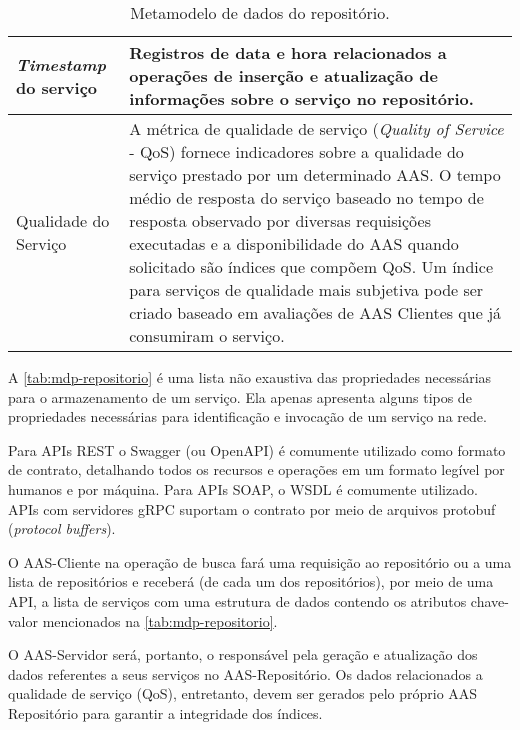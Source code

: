 \begin{table}[htb]
\begin{tabular}{p{4cm}p{11cm}}
		\hline
		\textit{Timestamp} do serviço
		 & Registros de data e hora relacionados a operações de inserção e atualização de informações sobre o serviço no repositório.                                                                                                                                                                                                                                                                                                                                                               \\

		\hline
		Qualidade do Serviço
		 & A métrica de qualidade de serviço (\textit{Quality of Service} - QoS) fornece indicadores sobre a qualidade do serviço prestado por um determinado AAS. O tempo médio de resposta do serviço baseado no tempo de resposta observado por diversas requisições executadas e a disponibilidade do AAS quando solicitado são índices que compõem QoS. Um índice para serviços de qualidade mais subjetiva pode ser criado baseado em avaliações de AAS Clientes que já consumiram o serviço. \\

		\hline
	\end{tabular}
	\caption{Metamodelo de dados do repositório.}
	\label{tab:mdp-repositorio}
\end{table}

A \autoref{tab:mdp-repositorio} é uma lista não exaustiva das propriedades necessárias para o armazenamento de um serviço. Ela apenas apresenta alguns tipos de propriedades necessárias para identificação e invocação de um serviço na rede.

Para APIs REST o Swagger (ou OpenAPI) é comumente utilizado como formato de contrato, detalhando todos os recursos e operações em um formato legível por humanos e por máquina. Para APIs SOAP, o WSDL é comumente utilizado. APIs com servidores gRPC suportam o contrato por meio de arquivos protobuf (\textit{protocol buffers}).

O AAS-Cliente na operação de busca fará uma requisição ao repositório ou a uma lista de repositórios e receberá (de cada um dos repositórios), por meio de uma API, a lista de serviços com uma estrutura de dados contendo os atributos chave-valor mencionados na \autoref{tab:mdp-repositorio}.

O AAS-Servidor será, portanto, o responsável pela geração e atualização dos dados referentes a seus serviços no AAS-Repositório. Os dados relacionados a qualidade de serviço (QoS), entretanto, devem ser gerados pelo próprio AAS Repositório para garantir a integridade dos índices.

